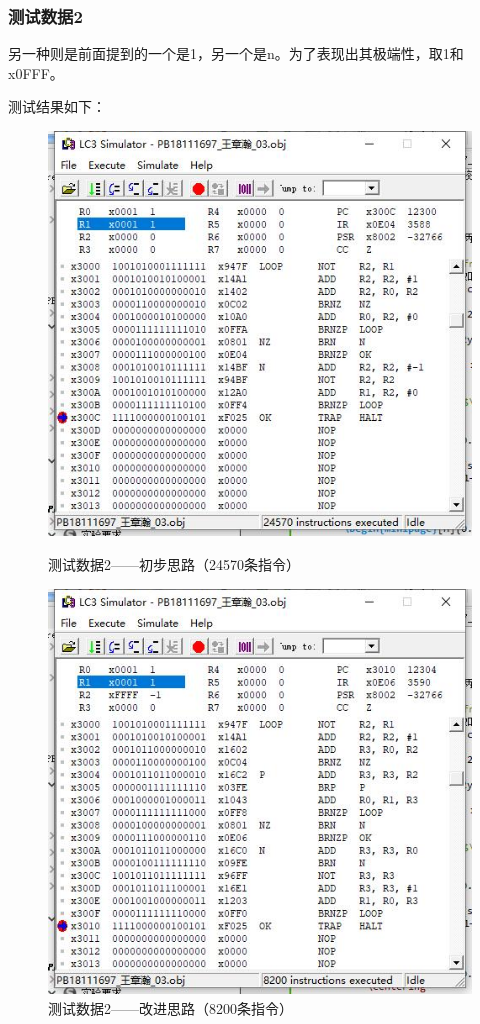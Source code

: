 \documentclass[UTF8]{article}
\begin{document}
	\subsubsection{测试数据2}
	另一种则是前面提到的一个是1，另一个是n。为了表现出其极端性，取1和x0FFF。\par
	测试结果如下：\par
	\begin{figure}[H]
		\begin{minipage}[H]{0.48\linewidth}
			\centering
			\includegraphics[scale=0.45]{data2_1.jpg}
			\caption{测试数据2——初步思路（24570条指令）}
			\label{data2_1}
		\end{minipage}
		\qquad
		\begin{minipage}[H]{0.48\linewidth}
			\centering
			\includegraphics[scale=0.45]{data2_2.jpg}
			\caption{测试数据2——改进思路（8200条指令）}
			\label{data2_2}
		\end{minipage}
	\end{figure}
\end{document}
